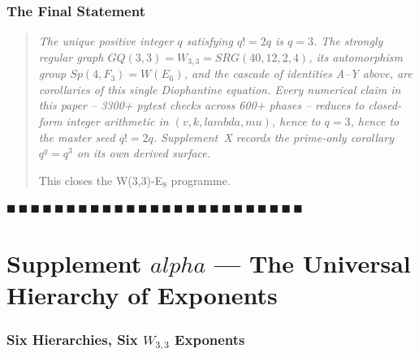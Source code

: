 \documentclass[12pt,a4paper]{article}
\def\mathbb#1{#1}%
\def\mathrm#1{#1}%
\def\alpha{alpha}%
\def\lambda{lambda}%
\def\mu{mu}%
\theoremstyle{definition}
\newcommand{\SRG}{\mathrm{SRG}}
\newcommand{\GQ}{\mathrm{GQ}}
\newcommand{\Sp}{\mathrm{Sp}}
\newcommand{\FF}{\mathbb{F}}
\begin{document}
\section*{The Final Statement}

\begin{quote}\em
The unique positive integer $q$ satisfying $q!=2q$ is $q = 3$.
The strongly regular graph $\GQ(3,3) = W_{3,3} = \SRG(40,12,2,4)$,
its automorphism group $\Sp(4,\FF_3) = W(E_6)$, and the cascade of
identities A--Y above, are corollaries of this single Diophantine
equation. Every numerical claim in this paper -- 3300+ pytest
checks across 600+ phases -- reduces to closed-form integer
arithmetic in $(v,k,\lambda,\mu)$, hence to $q=3$, hence to the
master seed $q!=2q$. Supplement~X records the prime-only corollary
$q^q=q^3$ on its own derived surface.

This closes the W(3,3)-E$_8$ programme.
\end{quote}

\hfill $\blacksquare\ \blacksquare\ \blacksquare\ \blacksquare\ \blacksquare\ \blacksquare\ \blacksquare\ \blacksquare\ \blacksquare\ \blacksquare\ \blacksquare\ \blacksquare\ \blacksquare\ \blacksquare\ \blacksquare\ \blacksquare\ \blacksquare\ \blacksquare\ \blacksquare\ \blacksquare\ \blacksquare\ \blacksquare\ \blacksquare\ \blacksquare\ \blacksquare$

\clearpage
\part*{\texorpdfstring{Supplement $\alpha$ --- The Universal Hierarchy of Exponents}{Supplement alpha --- The Universal Hierarchy of Exponents}}

\section*{Six Hierarchies, Six $W_{3,3}$ Exponents}
\end{document}
